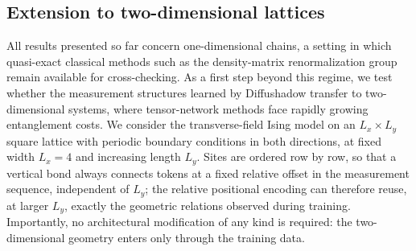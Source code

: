 %

\subsection{Extension to two-dimensional lattices}

All results presented so far concern one-dimensional chains, a setting in
which quasi-exact classical methods such as the density-matrix
renormalization group remain available for cross-checking. As a first step
beyond this regime, we test whether the measurement structures learned by
Diffushadow transfer to two-dimensional systems, where tensor-network
methods face rapidly growing entanglement costs. We consider the
transverse-field Ising model on an $L_x \times L_y$ square lattice with
periodic boundary conditions in both directions, at fixed width $L_x=4$ and
increasing length $L_y$. Sites are ordered row by row, so that a vertical
bond always connects tokens at a fixed relative offset in the measurement
sequence, independent of $L_y$; the relative positional encoding can
therefore reuse, at larger $L_y$, exactly the geometric relations observed
during training. Importantly, no architectural modification of any kind is
required: the two-dimensional geometry enters only through the training
data.

